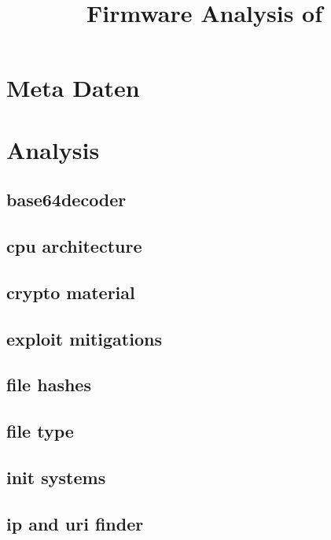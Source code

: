 \documentclass{article}
\begin{document}
\title{Firmware Analysis of }

\maketitle

\section{Meta Daten}


\section{Analysis}

\subsection{base64decoder}


\subsection{cpu architecture}


\subsection{crypto material}


\subsection{exploit mitigations}


\subsection{file hashes}


\subsection{file type}


\subsection{init systems}


\subsection{ip and uri finder}

\end{document}
